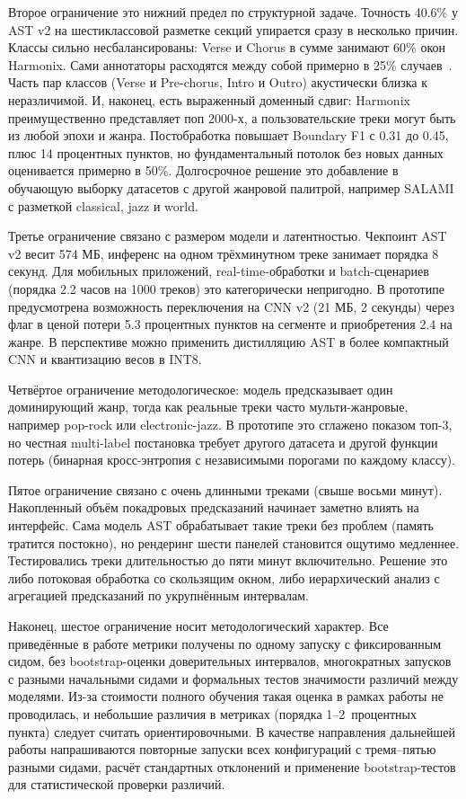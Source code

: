 Второе ограничение это нижний предел по структурной задаче. Точность 40.6\% у AST v2 на шестиклассовой разметке секций упирается сразу в несколько причин. Классы сильно несбалансированы: Verse и Chorus в сумме занимают 60\% окон Harmonix. Сами аннотаторы расходятся между собой примерно в 25\% случаев~\cite{smith2011salami}. Часть пар классов (Verse и Pre-chorus, Intro и Outro) акустически близка к неразличимой. И, наконец, есть выраженный доменный сдвиг: Harmonix преимущественно представляет поп 2000-х, а пользовательские треки могут быть из любой эпохи и жанра. Постобработка повышает Boundary F1 с 0.31 до 0.45, плюс 14 процентных пунктов, но фундаментальный потолок без новых данных оценивается примерно в 50\%. Долгосрочное решение это добавление в обучающую выборку датасетов с другой жанровой палитрой, например SALAMI с разметкой classical, jazz и world.

Третье ограничение связано с размером модели и латентностью. Чекпоинт AST v2 весит 574 МБ, инференс на одном трёхминутном треке занимает порядка 8 секунд. Для мобильных приложений, real-time-обработки и batch-сценариев (порядка 2.2 часов на 1000 треков) это категорически непригодно. В прототипе предусмотрена возможность переключения на CNN v2 (21 МБ, 2 секунды) через флаг  в  ценой потери 5.3 процентных пунктов на сегменте и приобретения 2.4 на жанре. В перспективе можно применить дистилляцию AST в более компактный CNN и квантизацию весов в INT8.

Четвёртое ограничение методологическое: модель предсказывает один доминирующий жанр, тогда как реальные треки часто мульти-жанровые, например pop-rock или electronic-jazz. В прототипе это сглажено показом топ-3, но честная multi-label постановка требует другого датасета и другой функции потерь (бинарная кросс-энтропия с независимыми порогами по каждому классу).

Пятое ограничение связано с очень длинными треками (свыше восьми минут). Накопленный объём покадровых предсказаний начинает заметно влиять на интерфейс. Сама модель AST обрабатывает такие треки без проблем (память тратится постокно), но рендеринг шести панелей становится ощутимо медленнее. Тестировались треки длительностью до пяти минут включительно. Решение это либо потоковая обработка со скользящим окном, либо иерархический анализ с агрегацией предсказаний по укрупнённым интервалам.

Наконец, шестое ограничение носит методологический характер. Все приведённые в работе метрики получены по одному запуску с фиксированным сидом, без bootstrap-оценки доверительных интервалов, многократных запусков с разными начальными сидами и формальных тестов значимости различий между моделями. Из-за стоимости полного обучения такая оценка в рамках работы не проводилась, и небольшие различия в метриках (порядка 1--2~процентных пункта) следует считать ориентировочными. В качестве направления дальнейшей работы напрашиваются повторные запуски всех конфигураций с тремя--пятью разными сидами, расчёт стандартных отклонений и применение bootstrap-тестов для статистической проверки различий.

